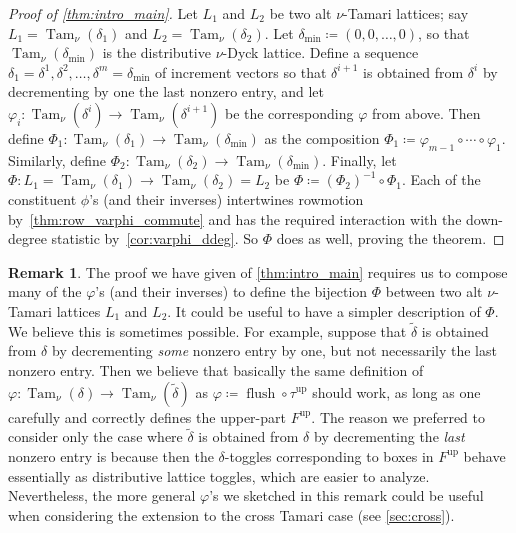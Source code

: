 \documentclass[11pt]{amsart}
\newcommand{\altTam}[2]{\operatorname{Tam}_{#1}(#2)}
\newcommand{\up}{^{\operatorname{up}}}
\DeclareMathOperator{\flush}{flush}
\theoremstyle{definition}
\newtheorem{remark}[theorem]{Remark}
\begin{document}
\begin{proof}[Proof of \cref{thm:intro_main}]
Let $L_1$ and $L_2$ be two alt $\nu$-Tamari lattices; say $L_1=\altTam{\nu}{\delta_1}$ and $L_2=\altTam{\nu}{\delta_2}$. Let $\delta_{\min} \coloneqq (0,0,\ldots,0)$, so that $\altTam{\nu}{\delta_{\min}}$ is the distributive $\nu$-Dyck lattice. Define a sequence $\delta_1=\delta^1,\delta^2,\ldots,\delta^m=\delta_{\min}$ of increment vectors so that $\delta^{i+1}$ is obtained from $\delta^{i}$ by decrementing by one the last nonzero entry, and let $\varphi_i\colon \altTam{\nu}{\delta^i}\to\altTam{\nu}{\delta^{i+1}}$ be the corresponding $\varphi$ from above. Then define $\Phi_1\colon\altTam{\nu}{\delta_1}\to\altTam{\nu}{\delta_{\min}}$ as the composition $\Phi_1\coloneqq \varphi_{m-1}\circ \cdots \circ \varphi_1$. Similarly, define $\Phi_2\colon\altTam{\nu}{\delta_2}\to\altTam{\nu}{\delta_{\min}}$. Finally, let $\Phi\colon L_1=\altTam{\nu}{\delta_1} \to \altTam{\nu}{\delta_2} = L_2$ be $\Phi\coloneqq (\Phi_2)^{-1}\circ\Phi_1$. Each of the constituent $\phi$'s (and their inverses) intertwines rowmotion by~\cref{thm:row_varphi_commute} and has the required interaction with the down-degree statistic by~\cref{cor:varphi_ddeg}. So $\Phi$ does as well, proving the theorem.
\end{proof}

\begin{remark}
The proof we have given of \cref{thm:intro_main} requires us to compose many of the $\varphi$'s (and their inverses) to define the bijection $\Phi$ between two alt $\nu$-Tamari lattices $L_1$ and $L_2$. It could be useful to have a simpler description of $\Phi$. We believe this is sometimes possible. For example, suppose that $\widetilde{\delta}$ is obtained from $\delta$ by decrementing \emph{some} nonzero entry by one, but not necessarily the last nonzero entry. Then we believe that basically the same definition of $\varphi\colon \altTam{\nu}{\delta}\to\altTam{\nu}{\widetilde\delta}$ as $\varphi\coloneqq \flush \circ \tau\up$ should work, as long as one carefully and correctly defines the upper-part $F\up$. The reason we preferred to consider only the case where $\widetilde{\delta}$ is obtained from $\delta$ by decrementing the \emph{last} nonzero entry is because then the $\delta$-toggles corresponding to boxes in $F\up$ behave essentially as distributive lattice toggles, which are easier to analyze. Nevertheless, the more general $\varphi$'s we sketched in this remark could be useful when considering the extension to the cross Tamari case (see \cref{sec:cross}).
\end{remark}
\end{document}
